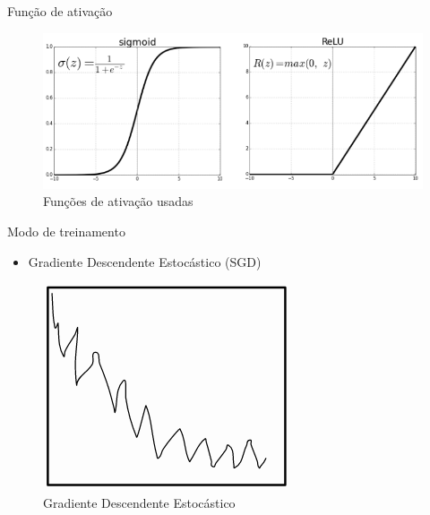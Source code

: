 \documentclass[xcolor=dvipsnames]{beamer}
\begin{document}
        \begin{frame}{Função de ativação}
            \begin{figure}
                \centering
                \includegraphics[scale=0.4]{Imagens/ativacao.png}
                \caption{Funções de ativação usadas}
                \label{fig:neuronio}
            \end{figure}
        \end{frame}
        \begin{frame}{Modo de treinamento}
            \begin{itemize}
                \item Gradiente Descendente Estocástico (SGD)
            \end{itemize}
            \begin{figure}
                \centering
                \includegraphics[scale=0.5]{Imagens/gradient.png}
                \caption{Gradiente Descendente Estocástico}
                \label{fig:gradient}
            \end{figure}
        \end{frame}
\end{document}
